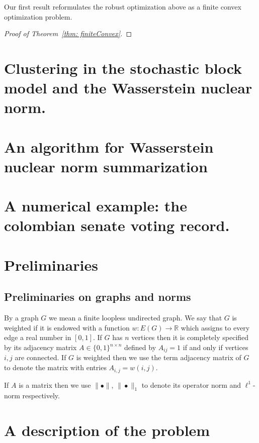 \documentclass[12pt]{amsart}
\theoremstyle{remark}
\newcommand{\RR}{\mathbb{R}}
\begin{document}
Our first result reformulates the robust optimization above as a finite convex optimization problem.
\begin{proof}[Proof of Theorem~\ref{thm: finiteConvex}]
\end{proof}


\section{Clustering in the stochastic block model and the Wasserstein nuclear norm.}

\section{An algorithm for Wasserstein nuclear norm summarization }

\section{A numerical example: the colombian senate voting record.}

\section{Preliminaries}





\subsection{ Preliminaries on graphs and norms}

By a graph $G$ we mean a finite loopless undirected graph. We say that $G$ is weighted if it is endowed with a function $w: E(G)\rightarrow \RR$ which assigns to every edge a real number in $[0,1]$. If $G$ has $n$ vertices then it is completely specified by its adjacency matrix $A\in \{0,1\}^{n\times n}$ defined by $A_{ij}=1$ if and only if vertices $i,j$ are connected. If $G$ is weighted then we use the term adjacency matrix of $G$ to denote the matrix with entries $A_{i,j}=w(i,j)$. 

If $A$ is a matrix then we use $\|\bullet\|$, $\|\bullet\|_1$ to denote its operator norm and $\ell^1$-norm respectively.




\section{A description of the problem}
\end{document}
